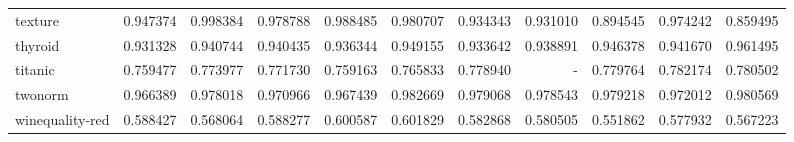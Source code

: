 \begin{tabular}{lrrrrrrrrrr}
texture         &   0.947374 &  0.998384 &  0.978788 &  0.988485 &  0.980707 &  0.934343 &  0.931010 &  0.894545 &  0.974242 &  0.859495 \\
thyroid         &   0.931328 &  0.940744 &  0.940435 &  0.936344 &  0.949155 &  0.933642 &  0.938891 &  0.946378 &  0.941670 &  0.961495 \\
titanic         &   0.759477 &  0.773977 &  0.771730 &  0.759163 &  0.765833 &  0.778940 &       - &  0.779764 &  0.782174 &  0.780502 \\
twonorm         &   0.966389 &  0.978018 &  0.970966 &  0.967439 &  0.982669 &  0.979068 &  0.978543 &  0.979218 &  0.972012 &  0.980569 \\
winequality-red &   0.588427 &  0.568064 &  0.588277 &  0.600587 &  0.601829 &  0.582868 &  0.580505 &  0.551862 &  0.577932 &  0.567223 \\
\bottomrule
\end{tabular}
